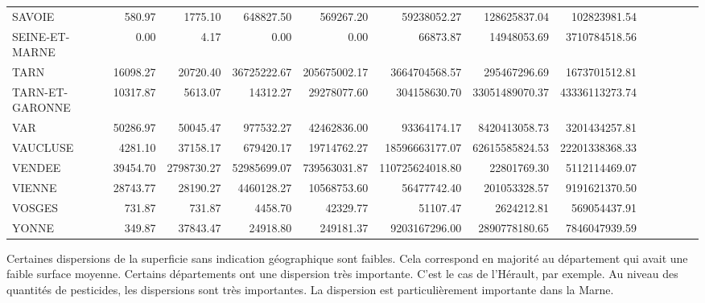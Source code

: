 \documentclass[11pt, a4paper]{article}
\begin{document}
\begin{landscape}
\begin{tabular}{lrrrrrrrrrrrr}
    SAVOIE & 580.97 & 1775.10 & 648827.50 & 569267.20 & 59238052.27 & 128625837.04 & 102823981.54 \\ 
    SEINE-ET-MARNE & 0.00 & 4.17 & 0.00 & 0.00 & 66873.87 & 14948053.69 & 3710784518.56 \\ 
    TARN & 16098.27 & 20720.40 & 36725222.67 & 205675002.17 & 3664704568.57 & 295467296.69 & 1673701512.81 \\ 
    TARN-ET-GARONNE & 10317.87 & 5613.07 & 14312.27 & 29278077.60 & 304158630.70 & 33051489070.37 & 43336113273.74 \\ 
    VAR & 50286.97 & 50045.47 & 977532.27 & 42462836.00 & 93364174.17 & 8420413058.73 & 3201434257.81 \\ 
    VAUCLUSE & 4281.10 & 37158.17 & 679420.17 & 19714762.27 & 18596663177.07 & 62615585824.53 & 22201338368.33 \\ 
    VENDEE & 39454.70 & 2798730.27 & 52985699.07 & 739563031.87 & 110725624018.80 & 22801769.30 & 5112114469.07 \\ 
    VIENNE & 28743.77 & 28190.27 & 4460128.27 & 10568753.60 & 56477742.40 & 201053328.57 & 9191621370.50 \\ 
    VOSGES & 731.87 & 731.87 & 4458.70 & 42329.77 & 51107.47 & 2624212.81 & 569054437.91 \\ 
    YONNE & 349.87 & 37843.47 & 24918.80 & 249181.37 & 9203167296.00 & 2890778180.65 & 7846047939.59 \\ 
     \hline
  \end{tabular}
  \FloatBarrier
  \par
Certaines dispersions de la superficie sans indication géographique sont faibles. 
Cela correspond en majorité au département qui avait une faible surface moyenne. 
Certains départements ont une dispersion très importante. 
C’est le cas de l’Hérault, par exemple. 
Au niveau des quantités de pesticides, les dispersions sont très importantes. 
La dispersion est particulièrement importante dans la Marne.
\end{landscape}
\newpage
\end{document}
